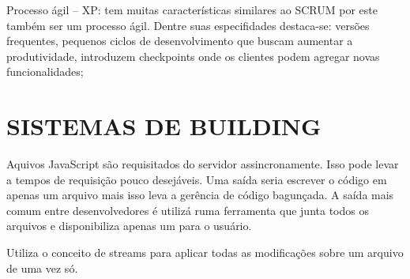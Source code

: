 Processo ágil – XP: tem muitas características similares ao SCRUM
por este também ser um processo ágil. Dentre suas especifidades
destaca-se: versões frequentes, pequenos ciclos de desenvolvimento que
buscam aumentar a produtividade, introduzem checkpoints onde os clientes
podem agregar novas funcionalidades;

\chapter{SISTEMAS DE BUILDING}

Aquivos JavaScript são requisitados do servidor assincronamente. Isso
pode levar a tempos de requisição pouco desejáveis. Uma saída seria
escrever o código em apenas um arquivo mais isso leva a gerência de
código bagunçada. A saída mais comum entre desenvolvedores é utilizá
ruma ferramenta que junta todos os arquivos e disponibiliza apenas um
para o usuário.

Utiliza o conceito de streams para aplicar todas as modificações sobre
um arquivo de uma vez só.

